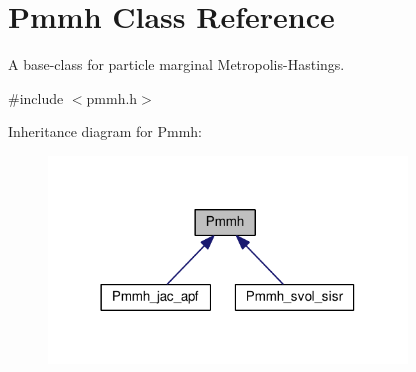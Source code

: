 \hypertarget{classPmmh}{}\section{Pmmh Class Reference}
\label{classPmmh}


A base-\/class for particle marginal Metropolis-\/\+Hastings.  




{\ttfamily \#include $<$pmmh.\+h$>$}



Inheritance diagram for Pmmh\+:\nopagebreak
\begin{figure}[H]
\begin{center}
\leavevmode
\includegraphics[width=270pt]{classPmmh__inherit__graph}
\end{center}
\end{figure}
